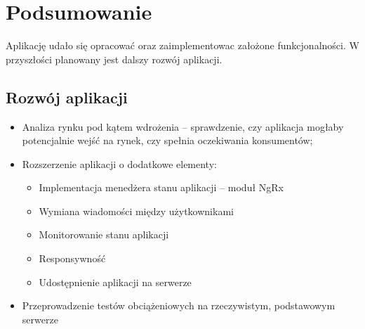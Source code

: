\chapter{Podsumowanie}
Aplikację udało się opracować oraz zaimplementowac założone funkcjonalności. W przyszłości planowany jest dalszy rozwój aplikacji.
\section{Rozwój aplikacji}
\begin{itemize}[leftmargin=1cm]
    \item Analiza rynku pod kątem wdrożenia -- sprawdzenie, czy aplikacja mogłaby potencjalnie wejść na rynek, czy spełnia oczekiwania konsumentów;
    \item Rozszerzenie aplikacji o dodatkowe elementy:
    \begin{itemize}
        \item Implementacja menedżera stanu aplikacji -- moduł NgRx
        \item Wymiana wiadomości między użytkownikami
        \item Monitorowanie stanu aplikacji
        \item Responsywność
        \item Udostępnienie aplikacji na serwerze
    \end{itemize}
    \item Przeprowadzenie testów obciążeniowych na rzeczywistym, podstawowym serwerze
\end{itemize}